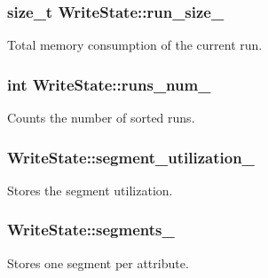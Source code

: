 \subsubsection[{run\+\_\+size\+\_\+}]{\setlength{\rightskip}{0pt plus 5cm}size\+\_\+t Write\+State\+::run\+\_\+size\+\_\+\hspace{0.3cm}{\ttfamily [private]}}\label{structWriteState_a77bff60be493ad28638135d43f4929c5}
Total memory consumption of the current run. \hypertarget{structWriteState_a6c1e55b3b77f064ada008f83f61ceb51}{}
\subsubsection[{runs\+\_\+num\+\_\+}]{\setlength{\rightskip}{0pt plus 5cm}int Write\+State\+::runs\+\_\+num\+\_\+\hspace{0.3cm}{\ttfamily [private]}}\label{structWriteState_a6c1e55b3b77f064ada008f83f61ceb51}
Counts the number of sorted runs. \hypertarget{structWriteState_a45a9a04b9520ed82c87322acfa94a72c}{}
\subsubsection[{segment\+\_\+utilization\+\_\+}]{ Write\+State\+::segment\+\_\+utilization\+\_\+\hspace{0.3cm}{\ttfamily [private]}}\label{structWriteState_a45a9a04b9520ed82c87322acfa94a72c}
Stores the segment utilization. \hypertarget{structWriteState_a4261c22f11c9f6bd4e5ef0ad91e13c90}{}
\subsubsection[{segments\+\_\+}]{ Write\+State\+::segments\+\_\+\hspace{0.3cm}{\ttfamily [private]}}\label{structWriteState_a4261c22f11c9f6bd4e5ef0ad91e13c90}
Stores one segment per attribute. \hypertarget{structWriteState_a6f1997f7702ccd133959484348faf49d}{}
